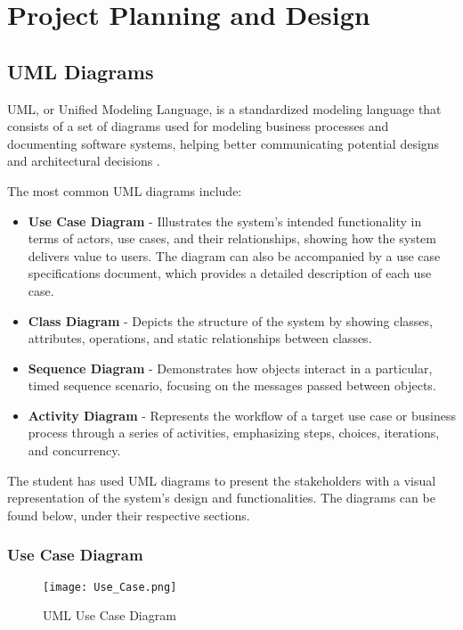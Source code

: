 \chapter{Project Planning and Design}

\section{UML Diagrams}

UML, or Unified Modeling Language, is a standardized modeling language that consists of a set of diagrams used for modeling business processes and documenting software systems, helping better communicating potential designs and architectural decisions \parencite{uml}. 

The most common UML diagrams include:
\begin{itemize}
    \item \textbf{Use Case Diagram} - Illustrates the system's intended functionality in terms of actors, use cases, and their relationships, showing how the system delivers value to users. The diagram can also be accompanied by a use case specifications document, which provides a detailed description of each use case.
    \item \textbf{Class Diagram} - Depicts the structure of the system by showing classes, attributes, operations, and static relationships between classes.
    \item \textbf{Sequence Diagram} - Demonstrates how objects interact in a particular, timed sequence scenario, focusing on the messages passed between objects.
    \item \textbf{Activity Diagram} - Represents the workflow of a target use case or business process through a series of activities, emphasizing steps, choices, iterations, and concurrency.
\end{itemize}

The student has used UML diagrams to present the stakeholders with a visual representation of the system's design and functionalities. The diagrams can be found below, under their respective sections.

\subsection{Use Case Diagram}
\begin{figure}[htbp]
    \centering
    \texttt{[image: Use\_Case.png]}
    \caption{UML Use Case Diagram}
    \label{fig:uml_usecase}
\end{figure}

